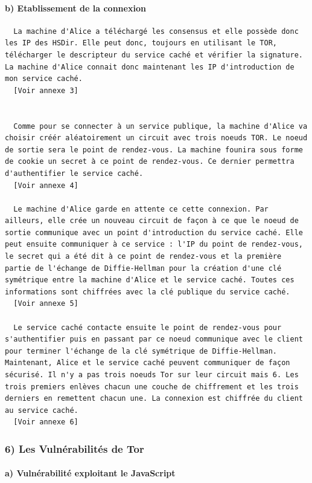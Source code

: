 \documentclass[]{article}
\let\oldparagraph\paragraph
\renewcommand{\paragraph}[1]{\oldparagraph{#1}\mbox{}}
\begin{document}
\paragraph{b) Etablissement de la
connexion}\label{b-etablissement-de-la-connexion}

\begin{verbatim}
  La machine d'Alice a téléchargé les consensus et elle possède donc les IP des HSDir. Elle peut donc, toujours en utilisant le TOR, télécharger le descripteur du service caché et vérifier la signature. La machine d'Alice connait donc maintenant les IP d'introduction de mon service caché.
  [Voir annexe 3]


  Comme pour se connecter à un service publique, la machine d'Alice va choisir créér aléatoirement un circuit avec trois noeuds TOR. Le noeud de sortie sera le point de rendez-vous. La machine founira sous forme de cookie un secret à ce point de rendez-vous. Ce dernier permettra d'authentifier le service caché.
  [Voir annexe 4]

  Le machine d'Alice garde en attente ce cette connexion. Par ailleurs, elle crée un nouveau circuit de façon à ce que le noeud de sortie communique avec un point d'introduction du service caché. Elle peut ensuite communiquer à ce service : l'IP du point de rendez-vous, le secret qui a été dit à ce point de rendez-vous et la première partie de l'échange de Diffie-Hellman pour la création d'une clé symétrique entre la machine d'Alice et le service caché. Toutes ces informations sont chiffrées avec la clé publique du service caché.
  [Voir annexe 5]

  Le service caché contacte ensuite le point de rendez-vous pour s'authentifier puis en passant par ce noeud communique avec le client pour terminer l'échange de la clé symétrique de Diffie-Hellman. Maintenant, Alice et le service caché peuvent communiquer de façon sécurisé. Il n'y a pas trois noeuds Tor sur leur circuit mais 6. Les trois premiers enlèves chacun une couche de chiffrement et les trois derniers en remettent chacun une. La connexion est chiffrée du client au service caché.
  [Voir annexe 6]
\end{verbatim}

\subsubsection{6) Les Vulnérabilités de
Tor}\label{les-vulnuxe9rabilituxe9s-de-tor}

\paragraph{a) Vulnérabilité exploitant le
JavaScript}\label{a-vulnuxe9rabilituxe9-exploitant-le-javascript}
\end{document}
